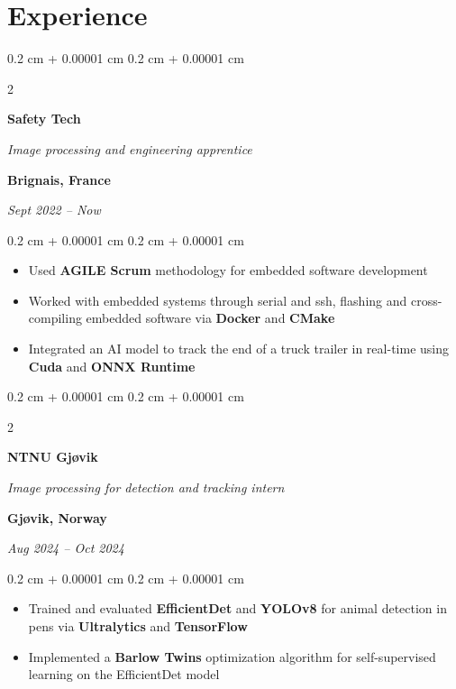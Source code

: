 \documentclass[10pt, letterpaper]{article}
\newenvironment{highlights}{
    \begin{itemize}[
        topsep=0.10 cm,
        parsep=0.10 cm,
        partopsep=0pt,
        itemsep=0pt,
        leftmargin=0.4 cm + 10pt
    ]
}{
    \end{itemize}
} %
\newenvironment{onecolentry}{
    \begin{adjustwidth}{
        0.2 cm + 0.00001 cm
    }{
        0.2 cm + 0.00001 cm
    }
}{
    \end{adjustwidth}
} %
\newenvironment{twocolentry}[2][]{
    \onecolentry
    \def\secondColumn{#2}
    \setcolumnwidth{\fill, 6 cm}
    \begin{paracol}{2}
}{
    \switchcolumn \raggedleft \secondColumn
    \end{paracol}
    \endonecolentry
} %
\begin{document}

    \section{Experience}
        \begin{twocolentry}{
			\textbf{Brignais, France}

			\textit{Sept 2022 – Now}}
            \textbf{Safety Tech}

            \textit{Image processing and engineering apprentice}
        \end{twocolentry}

        \vspace{0.2 cm}
        \begin{onecolentry}
            \begin{highlights}
                \item Used \textbf{AGILE Scrum} methodology for embedded software development
				\item Worked with embedded systems through serial and ssh, flashing and cross-compiling embedded software via \textbf{Docker} and \textbf{CMake}
				\item Integrated an AI model to track the end of a truck trailer in real-time using \textbf{Cuda} and \textbf{ONNX Runtime}
            \end{highlights}
        \end{onecolentry}

		\vspace{0.8 cm}
        \begin{twocolentry}{
			\textbf{Gjøvik, Norway}

			\textit{Aug 2024 – Oct 2024}}
			\textbf{NTNU Gjøvik}

			\textit{Image processing for detection and tracking intern}
        \end{twocolentry}

        \vspace{0.2 cm}
        \begin{onecolentry}
            \begin{highlights}
                \item Trained and evaluated \textbf{EfficientDet} and \textbf{YOLOv8} for animal detection in pens via \textbf{Ultralytics} and \textbf{TensorFlow}
                \item Implemented a \textbf{Barlow Twins} optimization algorithm for self-supervised learning on the EfficientDet model
            \end{highlights}
        \end{onecolentry}
\end{document}

